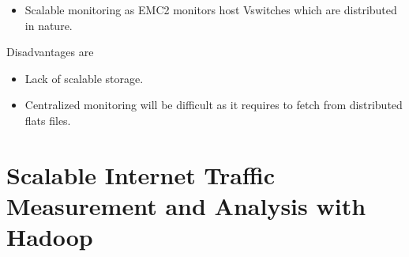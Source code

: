     \begin{itemize}
     \item Scalable monitoring as EMC2 monitors host Vswitches which are distributed in nature. 
    \end{itemize}
    
    Disadvantages are
    
     \begin{itemize}
      \item Lack of scalable storage.
      \item Centralized monitoring will be difficult as it requires to fetch from distributed flats files.
     \end{itemize}
   \section{Scalable Internet Traffic Measurement and Analysis with Hadoop\cite{Lee}}
   